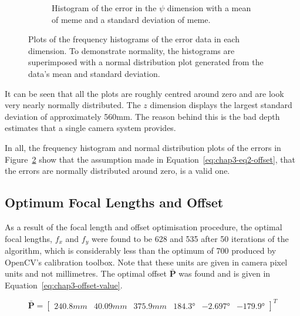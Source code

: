 \begin{figure}
\begin{subfigure}{0.45\textwidth}
     \caption{Histogram of the error in the $\psi$ dimension with a mean of meme and a standard deviation of meme. }
  \label{fig:norm-yaw}
  \end{subfigure}
  \caption[Plots of the frequency histograms of the error data in each dimension.]{Plots of the frequency histograms of the error data in each dimension. To demonstrate normality, the histograms are superimposed with a normal distribution plot generated from the data's mean and standard deviation.}
  \label{fig:err-norm}
\end{figure}

It can be seen that all the plots are roughly centred around zero and are look very nearly normally distributed. The $z$ dimension displays the largest standard deviation of approximately 560mm. The reason behind this is the bad depth estimates that a single camera system provides. 

In all, the frequency histogram and normal distribution plots of the errors in Figure~\ref{fig:err-norm} show that the assumption made in Equation~\ref{eq:chap3-eq2-offset}, that the errors are normally distributed around zero, is a valid one. 

\subsection{Optimum Focal Lengths and Offset}

As a result of the focal length and offset optimisation procedure, the optimal focal lengths, $f_x$ and $f_y$ were found to be 628 and 535 after 50 iterations of the algorithm, which is considerably less than the optimum of 700 produced by OpenCV's calibration toolbox. Note that these units are given in camera pixel units and not millimetres. The optimal offset $\bar{\bm{P}}$ was found and is given in Equation~\ref{eq:chap3-offset-value}.

\begin{equation}
  \label{eq:chap3-offset-value}
  \bar{\bm{P}} = 
  \begin{bmatrix}
    240.8mm & 40.09mm & 375.9mm & \ang{184.3} & \ang{-2.697} & \ang{-179.9}
  \end{bmatrix}^T
\end{equation}

